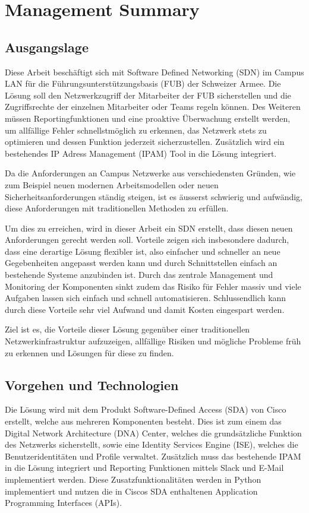 \section{Management Summary}

\subsection{Ausgangslage}
Diese Arbeit beschäftigt sich mit Software Defined Networking (SDN) im Campus LAN für die Führungsunterstützungsbasis (FUB) der Schweizer Armee. Die Lösung soll den Netzwerkzugriff der Mitarbeiter der FUB sicherstellen und die Zugriffsrechte der einzelnen Mitarbeiter oder Teams regeln können. 
Des Weiteren müssen Reportingfunktionen und eine proaktive Überwachung erstellt werden, um allfällige Fehler schnellstmöglich zu erkennen, das Netzwerk stets zu optimieren und dessen Funktion jederzeit sicherzustellen.
Zusätzlich wird ein bestehendes IP Adress Management (IPAM) Tool in die Lösung integriert.

Da die Anforderungen an Campus Netzwerke aus verschiedensten Gründen, wie zum Beispiel neuen modernen Arbeitsmodellen oder neuen Sicherheitsanforderungen ständig steigen, ist es äusserst schwierig und aufwändig, diese Anforderungen mit traditionellen Methoden zu erfüllen. 

Um dies zu erreichen, wird in dieser Arbeit ein SDN erstellt, dass diesen neuen Anforderungen gerecht werden soll. Vorteile zeigen sich insbesondere dadurch, dass eine derartige Lösung flexibler ist, also einfacher und schneller an neue Gegebenheiten angepasst werden kann und durch Schnittstellen einfach an bestehende Systeme anzubinden ist. Durch das zentrale Management und Monitoring der Komponenten sinkt zudem das Risiko für Fehler massiv und viele Aufgaben lassen sich einfach und schnell automatisieren.
Schlussendlich kann durch diese Vorteile sehr viel Aufwand und damit Kosten eingespart werden.

Ziel ist es, die Vorteile dieser Lösung gegenüber einer traditionellen Netzwerkinfrastruktur aufzuzeigen, allfällige Risiken und mögliche Probleme früh zu erkennen und Lösungen für diese zu finden. 
\subsection{Vorgehen und Technologien}
Die Lösung wird mit dem Produkt Software-Defined Access (SDA) von Cisco erstellt, welche aus mehreren Komponenten besteht. Dies ist zum einem das Digital Network Architecture (DNA) Center, welches die grundsätzliche Funktion des Netzwerks sicherstellt, sowie eine Identity Services Engine (ISE), welches die Benutzeridentitäten und Profile verwaltet.
Zusätzlich muss das bestehende IPAM in die Lösung integriert und Reporting Funktionen mittels Slack und E-Mail implementiert werden. Diese Zusatzfunktionalitäten werden in Python implementiert und nutzen die in Ciscos SDA enthaltenen Application Programming Interfaces (APIs).

